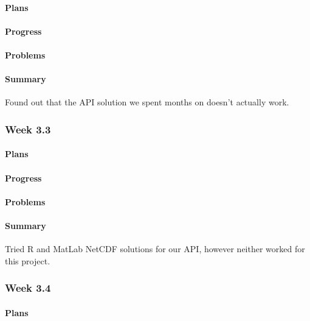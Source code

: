 \documentclass[onecolumn, draftclsnofoot,10pt, compsoc]{article}
\begin{document}
		    \paragraph{Plans} \hfill \break

		    \paragraph{Progress} \hfill \break
		        
		    \paragraph{Problems} \hfill \break
		        
		    \paragraph{Summary} \hfill \break
		            Found out that the API solution we spent months on doesn't actually work.
		    
    
		\subsubsection{Week 3.3}
		    \paragraph{Plans} \hfill \break

		    \paragraph{Progress} \hfill \break
		        
		    \paragraph{Problems} \hfill \break

		    \paragraph{Summary} \hfill \break
		        Tried R and MatLab NetCDF solutions for our API, however neither worked for this project. 

		\subsubsection{Week 3.4}
		    \paragraph{Plans} \hfill \break
\end{document}
